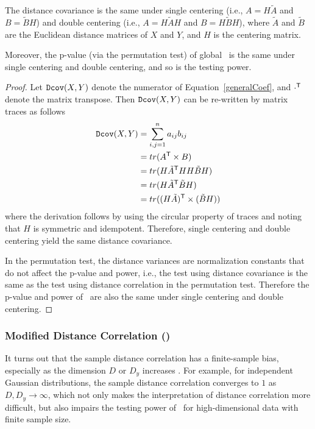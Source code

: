\documentclass[11pt]{extarticle}
\begin{document}
\begin{lem}
\label{lem1}
The distance covariance is the same under single centering (i.e., $A=H\tilde{A}$ and $B=\tilde{B}H$) and double centering (i.e., $A=H\tilde{A}H$ and $B=H\tilde{B}H$), where $\tilde{A}$ and $\tilde{B}$ are the Euclidean distance matrices of $X$ and $Y$, and $H$ is the centering matrix.

Moreover, the p-value (via the permutation test) of global \Dcorr~is the same under single centering and double centering, and so is the testing power.
\end{lem}
\begin{proof}
Let ${\sc \texttt{Dcov}}(X,Y)$ denote the numerator of Equation~\ref{generalCoef}, and $\cdot^{\mathsf{T}}$ denote the matrix transpose. Then ${\sc \texttt{Dcov}}(X,Y)$ can be re-written by matrix traces as follows
\begin{align*}
{\sc \texttt{Dcov}}(X,Y) &= \sum_{i,j=1}^{n}a_{ij}b_{ij} \\
 &= tr(A^{\mathsf{T}} \times B) \\
 &= tr(H\tilde{A}^{\mathsf{T}} HH\tilde{B}H) \\
 &= tr(H\tilde{A}^{\mathsf{T}} \tilde{B}H) \\
 &= tr((H\tilde{A})^{\mathsf{T}} \times (\tilde{B}H))
\end{align*}
where the derivation follows by using the circular property of traces and noting that $H$ is symmetric and idempotent. Therefore, single centering and double centering yield the same distance covariance.

In the permutation test, the distance variances are normalization constants that do not affect the p-value and power, i.e., the test using distance covariance is the same as the test using distance correlation in the permutation test. Therefore the p-value and power of \Dcorr~are also the same under single centering and double centering.
\end{proof}

\subsubsection{Modified Distance Correlation (\Mcorr)}
\label{appen:mcorr}
It turns out that the sample distance correlation has a finite-sample bias, especially as the dimension $D$ or $D_y$ increases \cite{SzekelyRizzo2013a}. For example, for independent Gaussian distributions, the sample distance correlation converges to $1$ as $D, D_y \rightarrow \infty$, which not only makes the interpretation of distance correlation more difficult, but also impairs the testing power of \Dcorr~for high-dimensional data with finite sample size.
\end{document}

